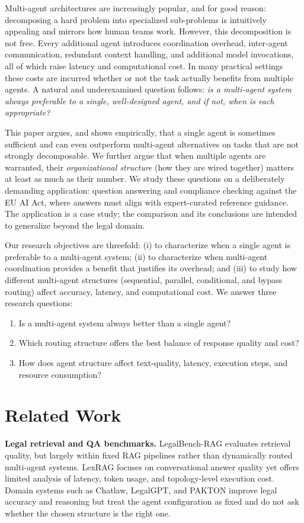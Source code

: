 \documentclass[journal,10pt,compsoc,onecolumn]{IEEEtran}
\begin{document}
Multi-agent architectures are increasingly popular, and for good reason: decomposing a hard problem into specialized sub-problems is intuitively appealing and mirrors how human teams work. However, this decomposition is not free. Every additional agent introduces coordination overhead, inter-agent communication, redundant context handling, and additional model invocations, all of which raise latency and computational cost. In many practical settings these costs are incurred whether or not the task actually benefits from multiple agents. A natural and underexamined question follows: \emph{is a multi-agent system always preferable to a single, well-designed agent, and if not, when is each appropriate?}

This paper argues, and shows empirically, that a single agent is sometimes sufficient and can even outperform multi-agent alternatives on tasks that are not strongly decomposable. We further argue that when multiple agents are warranted, their \emph{organizational structure} (how they are wired together) matters at least as much as their number. We study these questions on a deliberately demanding application: question answering and compliance checking against the EU AI Act, where answers must align with expert-curated reference guidance. The application is a case study; the comparison and its conclusions are intended to generalize beyond the legal domain.

Our research objectives are threefold: (i) to characterize when a single agent is preferable to a multi-agent system; (ii) to characterize when multi-agent coordination provides a benefit that justifies its overhead; and (iii) to study how different multi-agent structures (sequential, parallel, conditional, and bypass routing) affect accuracy, latency, and computational cost. We answer three research questions:
\begin{enumerate}
    \item Is a multi-agent system always better than a single agent?
    \item Which routing structure offers the best balance of response quality and cost?
    \item How does agent structure affect text-quality, latency, execution steps, and resource consumption?
\end{enumerate}

\section{Related Work}
\textbf{Legal retrieval and QA benchmarks.} LegalBench-RAG evaluates retrieval quality, but largely within fixed RAG pipelines rather than dynamically routed multi-agent systems. LexRAG focuses on conversational answer quality yet offers limited analysis of latency, token usage, and topology-level execution cost. Domain systems such as Chatlaw, LegalGPT, and PAKTON improve legal accuracy and reasoning but treat the agent configuration as fixed and do not ask whether the chosen structure is the right one.
\end{document}
